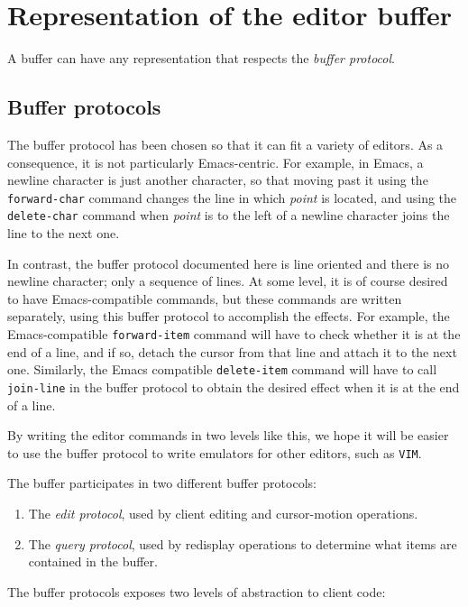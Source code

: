 \chapter{Representation of the editor buffer}
\label{chap-internals-buffer}

A buffer can have any representation that respects the \emph{buffer
  protocol}.

\section{Buffer protocols}

The buffer protocol has been chosen so that it can fit a variety of
editors.  As a consequence, it is not particularly Emacs-centric.  For
example, in Emacs, a newline character is just another character, so
that moving past it using the \texttt{forward-char} command changes
the line in which \emph{point} is located, and using the
\texttt{delete-char} command when \emph{point} is to the left of a
newline character joins the line to the next one.

In contrast, the buffer protocol documented here is line oriented and
there is no newline character; only a sequence of lines.  At some
level, it is of course desired to have Emacs-compatible commands, but
these commands are written separately, using this buffer protocol to
accomplish the effects.  For example, the Emacs-compatible
\texttt{forward-item} command will have to check whether it is at the
end of a line, and if so, detach the cursor from that line and attach
it to the next one.  Similarly, the Emacs compatible
\texttt{delete-item} command will have to call \texttt{join-line} in
the buffer protocol to obtain the desired effect when it is at the end
of a line.

By writing the editor commands in two levels like this, we hope it
will be easier to use the buffer protocol to write emulators for other
editors, such as \texttt{VIM}.  

The buffer participates in two different buffer protocols:

\begin{enumerate}
\item The \emph{edit protocol}, used by client editing and
  cursor-motion operations.
\item The \emph{query protocol}, used by redisplay operations to
  determine what items are contained in the buffer. 
\end{enumerate}

The buffer protocols exposes two levels of abstraction to client code: 

